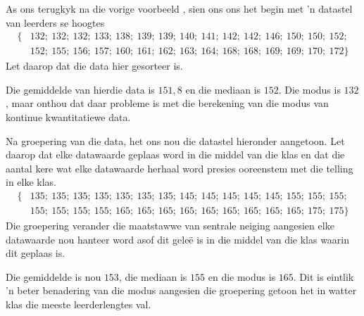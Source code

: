 As ons terugkyk na die vorige voorbeeld , sien ons ons het begin met ’n datastel van leerders se hoogtes
\begin{align*}
  \{&132;\ 132;\ 132;\ 133;\ 138;\ 139;\ 139;\ 140;\ 141;\ 142;\ 142;\ 146;\ 150;\ 150;\ 152;\\
    &152;\ 155;\ 156;\ 157;\ 160;\ 161;\ 162;\ 163;\ 164;\ 168;\ 168;\ 169;\ 169;\ 170;\ 172\}
\end{align*}
Let daarop dat die data hier gesorteer is.

Die gemiddelde van hierdie data is $151,8$ en die mediaan is $152$. Die modus is $132$, maar onthou dat daar probleme is met die berekening van die modus van kontinue kwantitatiewe data. \par

Na groepering van die data, het ons nou die datastel hieronder aangetoon. Let daarop dat elke datawaarde geplaas word in die middel van die klas en dat die aantal kere wat elke datawaarde herhaal word presies ooreenstem met die telling in elke klas. 
\begin{align*}
  \{&135;\ 135;\ 135;\ 135;\ 135;\ 135;\ 135;\ 145;\ 145;\ 145;\ 145;\ 145;\ 155;\ 155;\ 155;\\
    &155;\ 155;\ 155;\ 155;\ 165;\ 165;\ 165;\ 165;\ 165;\ 165;\ 165;\ 165;\ 165;\ 175;\ 175\}
\end{align*}
Die groepering verander die maatstawwe van sentrale neiging aangesien elke datawaarde nou hanteer word asof dit geleë is in die middel van die klas waarin dit geplaas is. \par

Die gemiddelde is nou $153$, die mediaan is $155$ en die modus is $165$. Dit is eintlik ’n beter benadering van die modus aangesien die groepering getoon het in watter klas die meeste leerderlengtes val. 


